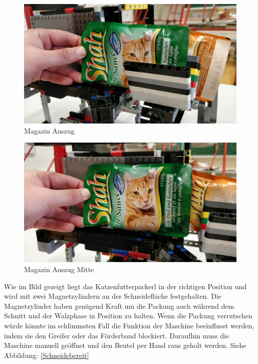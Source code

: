 \begin{figure}[H]
\begin{center}
\includegraphics[width=13cm]{Bilder/Ablauf_1_png/Magazin_Auszug.jpeg}
\caption{Magazin Auszug}
\label{Magazin Auszug}
\end{center}
\end{figure}

\begin{figure}[H]
\begin{center}
\includegraphics[width=13cm]{Bilder/Ablauf_1_png/Magazin_Auszug_2.jpeg}
\caption{Magazin Auszug Mitte}
\label{Magazin Mitte}
\end{center}
\end{figure}

Wie im Bild gezeigt liegt das Katzenfutterpackerl in der richtigen Position und wird mit zwei Magnetzylindern an der Schneidefläche festgehalten. Die Magnetzylinder haben genügend Kraft um die Packung auch während dem Schnitt und der Walzphase in Position zu halten. Wenn die Packung verrutschen würde könnte im schlimmsten Fall die Funktion der Maschine beeinflusst werden, indem sie den Greifer oder das Förderband blockiert. Daraufhin muss die Maschine manuell geöffnet und den Beutel per Hand raus geholt werden. Siehe Abbildung: \ref{Schneidebereit}

